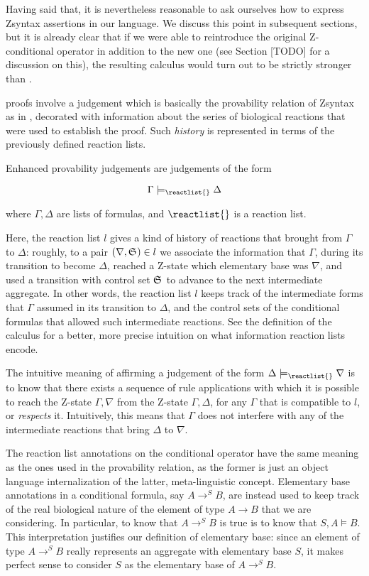 Having said that, it is nevertheless reasonable to ask ourselves how to
express Zsyntax assertions in our language. We discuss this point in subsequent
sections, but it is already clear that if we were able to reintroduce the
original Z-conditional operator in addition to the new one (see Section [TODO]
for a discussion on this), the resulting calculus would turn out to be strictly
stronger than \znd{}.

\eznd{} proofs involve a judgement which is basically the provability relation
of Zsyntax as in \cite{adding-logic}, decorated with information about the
series of biological reactions that were used to establish the proof. Such
\emph{history} is represented in terms of the previously defined reaction lists.

\begin{definition}
  Enhanced provability judgements are judgements of the form

  \[
    \Gamma \models_{\reactlist{}} \Delta
  \]

  where $\Gamma, \Delta$ are lists of formulas, and $\reactlist{}$ is a reaction
  list.
\end{definition}

Here, the reaction list $l$ gives a kind of history of reactions that brought
from $\Gamma$ to $\Delta$: roughly, to a pair $(\nabla, \mathfrak{S}_{}) \in l$ we
associate the information that $\Gamma$, during its transition to become
$\Delta$, reached a Z-state which elementary base was $\nabla$, and used a
transition with control set $\mathfrak{S}_{}$ to advance to the next intermediate
aggregate.  In other words, the reaction list $l$ keeps track of the
intermediate forms that $\Gamma$ assumed in its transition to $\Delta$, and the
control sets of the conditional formulas that allowed such intermediate
reactions. See the definition of the calculus for a better, more precise
intuition on what information reaction lists encode.

The intuitive meaning of affirming a judgement of the form
$\Delta \models_{\reactlist{}} \nabla$ is to know that there exists a sequence
of \eznd{} rule applications with which it is possible to reach the Z-state
$\Gamma, \nabla$ from the Z-state $\Gamma, \Delta$, for any $\Gamma$ that is
compatible to $l$, or \emph{respects} it. Intuitively, this means that $\Gamma$
does not interfere with any of the intermediate reactions that bring $\Delta$ to
$\nabla$.

The reaction list annotations on the conditional operator have the same meaning
as the ones used in the provability relation, as the former is just an object
language internalization of the latter, meta-linguistic concept.  Elementary
base annotations in a conditional formula, say $A \rightarrow^S B$, are instead
used to keep track of the real biological nature of the element of type
$A \rightarrow B$ that we are considering.
In particular, to know that $A \rightarrow^S B$ is true is to know that $S, A
\models B$. This interpretation justifies our definition of elementary base:
since an element of type $A \rightarrow^S B$ really represents an aggregate with
elementary base $S$, it makes perfect sense to consider $S$ as the elementary
base of $A \rightarrow^S B$.

